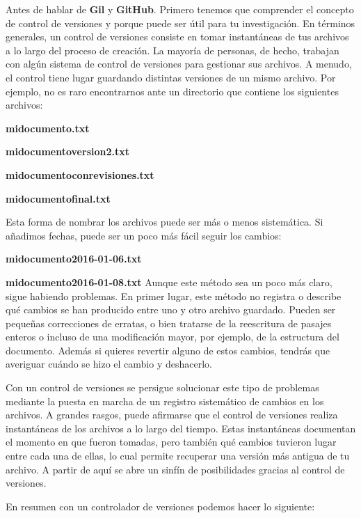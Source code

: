 Antes de hablar de \textbf{Gil} y \textbf{GitHub}. Primero tenemos que comprender el concepto de  control de versiones y porque puede ser útil para tu investigación.
En términos generales, un control de versiones consiste en tomar instantáneas de tus archivos a lo largo del proceso de creación. La mayoría de personas, de hecho, trabajan con algún sistema de control de versiones para gestionar sus archivos. A menudo, el control tiene lugar guardando distintas versiones de un mismo archivo. Por ejemplo, no es raro encontrarnos ante un directorio que contiene los siguientes archivos:\cite{strien_introduccion_2017}

\textbf{midocumento.txt}

\textbf{midocumentoversion2.txt}
   
\textbf{midocumentoconrevisiones.txt}

\textbf{midocumentofinal.txt}

Esta forma de nombrar los archivos puede ser más o menos sistemática. Si añadimos fechas, puede ser un poco más fácil seguir los cambios:

\textbf{midocumento2016-01-06.txt}

\textbf{midocumento2016-01-08.txt}
\newpage
Aunque este método sea un poco más claro, sigue habiendo problemas. En primer lugar, este método no registra o describe qué cambios se han producido entre uno y otro archivo guardado. Pueden ser pequeñas correcciones de erratas, o bien tratarse de la reescritura de pasajes enteros o incluso de una modificación mayor, por ejemplo, de la estructura del documento. Además si quieres revertir alguno de estos cambios, tendrás que averiguar cuándo se hizo el cambio y deshacerlo.\cite{strien_introduccion_2017}

Con un control de versiones se persigue solucionar este tipo de problemas mediante la puesta en marcha de un registro sistemático de cambios en los archivos. A grandes rasgos, puede afirmarse que el control de versiones realiza instantáneas de los archivos a lo largo del tiempo. Estas instantáneas documentan el momento en que fueron tomadas, pero también qué cambios tuvieron lugar entre cada una de ellas, lo cual permite recuperar una versión más antigua de tu archivo. A partir de aquí se abre un sinfín de posibilidades gracias al control de versiones.\cite{strien_introduccion_2017}

 En resumen con un controlador de versiones podemos hacer lo siguiente:

